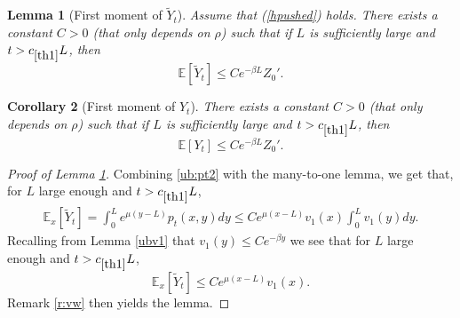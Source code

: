 \documentclass[11pt]{article}
\theoremstyle{plain}
\newtheorem{lemma}{Lemma}[section]
\newtheorem{cor}[lemma]{Corollary}
\newcommand\linf{\lambda_1^\infty}
\begin{document}
\begin{lemma}[First moment of $\tilde{Y}_t$]\label{lemmatild} Assume that (\ref{hpushed}) holds. There exists a constant $C>0$ (that only depends on $\rho$) such that if $L$ is sufficiently large  and $t>c_{\ref{th1}} L$, then 
\begin{equation*}
    \mathbb{E}[\tilde{Y}_t]\leqslant Ce^{-\beta L}Z_0'.
\end{equation*}
\end{lemma}
\begin{cor}[First moment of $Y_t$] \label{lem:fmY}
There exists a constant $C>0$ (that only depends on $\rho$) such that if $L$ is sufficiently large  and $t>c_{\ref{th1}} L$, then 
\begin{equation*}
    \mathbb{E}[Y_t]\leqslant Ce^{-\beta L}Z_0'.
\end{equation*}
\end{cor}
\begin{proof}[Proof of Lemma \ref{lemmatild}]
Combining \eqref{ub:pt2} with the many-to-one lemma, we get that, for $L$ large enough and  $t>c_{\ref{th1}}L$,
\begin{eqnarray*}
    \mathbb{E}_x[\tilde{Y}_t]=\int_0^Le^{\mu(y-L)}p_t(x,y)dy
     \leqslant Ce^{\mu(x-L)}v_1(x) \int_0^Lv_1(y)dy.\end{eqnarray*}
Recalling from Lemma \ref{ubv1} that  $v_1(y)\leqslant Ce^{-\beta y}$ we see that  for $L$ large enough and $t>c_{\ref{th1}}L$,
\begin{equation*}
 \mathbb{E}_x[\tilde{Y}_t]\leqslant Ce^{\mu(x-L)}v_1(x).
\end{equation*}
Remark \ref{r:vw} then yields the lemma.
\end{proof}
\end{document}
